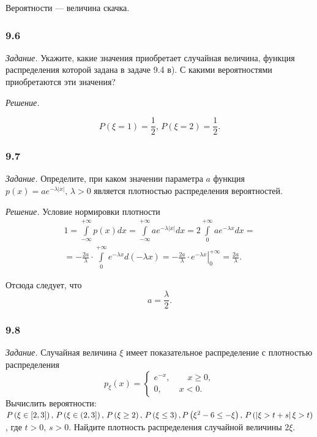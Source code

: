 Вероятности --- величина скачка.

\subsubsection*{9.6}

\textit{Задание.} Укажите, какие значения приобретает случайная величина, функция распределения которой задана в задаче 9.4 в).
С какими вероятностями приобретаются эти значения?

\textit{Решение.}

$$P \left( \xi = 1 \right) = \frac{1}{2}, \,
P \left( \xi = 2 \right) = \frac{1}{2}.$$

\subsubsection*{9.7}

\textit{Задание.}
Определите, 
при каком значении параметра $a$ функция $p \left( x \right) = ae^{- \lambda \left| x \right| }, \, \lambda > 0$ является плотностью распределения вероятностей.

\textit{Решение.} Условие нормировки плотности
\begin{equation*}
\begin{split}
1 =
\int \limits_{- \infty }^{+ \infty } p \left( x \right) dx =
\int \limits_{- \infty }^{+ \infty } ae^{- \lambda \left| x \right| } dx =
2 \int \limits_0^{+ \infty } ae^{- \lambda x} dx = \\
= - \frac{2a}{ \lambda } \cdot \int \limits_0^{+ \infty }e^{- \lambda x} d \left( - \lambda x \right) =
\left. - \frac{2a}{ \lambda } \cdot e^{- \lambda x} \right|_0^{+ \infty } =
\frac{2a}{ \lambda }.
\end{split}
\end{equation*}

Отсюда следует, что
$$a =
\frac{ \lambda }{2}.$$

\subsubsection*{9.8}

\textit{Задание.} Случайная величина $ \xi $ имеет показательное распределение с плотностью распределения
$$p_{ \xi } \left( x \right) =
\begin{cases}
e^{-x}, \qquad x \geq 0, \\
0, \qquad x < 0.
\end{cases}$$
Вычислить вероятности:
$P \left( \xi \in \left[ 2, 3 \right] \right), \,
P \left( \xi \in \left( 2, 3 \right] \right), \,
P \left( \xi \geq 2 \right), \,
P \left( \xi \leq 3 \right), \, \\
P \left( \xi^2 - 6 \leq - \xi \right), \,
P \left( \left| \xi > t+s \right| \xi > t \right) $,
где $t > 0, \, s > 0$.
Найдите плотность распределения случайной величины $2 \xi $.


